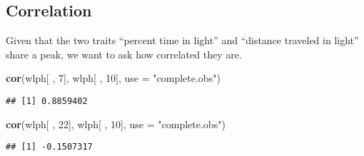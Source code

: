 \documentclass{book}
\newenvironment{Shaded}{\begin{snugshade}}{\end{snugshade}}
\newcommand{\DataTypeTok}[1]{\textcolor[rgb]{0.13,0.29,0.53}{#1}}
\newcommand{\DecValTok}[1]{\textcolor[rgb]{0.00,0.00,0.81}{#1}}
\newcommand{\KeywordTok}[1]{\textcolor[rgb]{0.13,0.29,0.53}{\textbf{#1}}}
\newcommand{\NormalTok}[1]{#1}
\newcommand{\OperatorTok}[1]{\textcolor[rgb]{0.81,0.36,0.00}{\textbf{#1}}}
\newcommand{\StringTok}[1]{\textcolor[rgb]{0.31,0.60,0.02}{#1}}
\begin{document}
\begin{Shaded}
\end{Shaded}

\hypertarget{correlation}{%
\subsection{Correlation}\label{correlation}}

Given that the two traits ``percent time in light'' and ``distance
traveled in light'' share a peak, we want to ask how correlated they
are.

\begin{Shaded}
\begin{Highlighting}[]
\KeywordTok{cor}\NormalTok{(wlph[ , }\DecValTok{7}\NormalTok{], wlph[ , }\DecValTok{10}\NormalTok{], }\DataTypeTok{use =} \StringTok{"complete.obs"}\NormalTok{)}
\end{Highlighting}
\end{Shaded}

\begin{verbatim}
## [1] 0.8859402
\end{verbatim}

\begin{Shaded}
\begin{Highlighting}[]
\KeywordTok{cor}\NormalTok{(wlph[ , }\DecValTok{22}\NormalTok{], wlph[ , }\DecValTok{10}\NormalTok{], }\DataTypeTok{use =} \StringTok{"complete.obs"}\NormalTok{)}
\end{Highlighting}
\end{Shaded}

\begin{verbatim}
## [1] -0.1507317
\end{verbatim}
\end{document}
